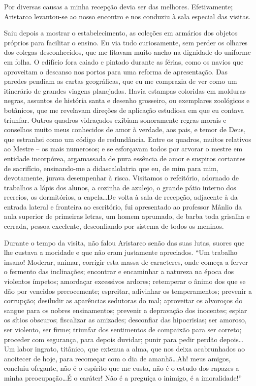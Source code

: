 Por diversas causas a minha recepção devia ser das melhores.
Efetivamente; Aristarco levantou{}-se ao nosso encontro e nos conduziu
à sala especial das visitas. 

Saiu depois a mostrar o estabelecimento,
as coleções em armários dos objetos próprios para facilitar o ensino.
Eu via tudo curiosamente, sem perder os olhares dos colegas
desconhecidos, que me fitavam muito ancho na dignidade do uniforme em
folha. O edifício fora caiado e pintado durante as férias, como os
navios que aproveitam o descanso nos portos para uma reforma de
apresentação. Das paredes pendiam as cartas geográficas, que eu me
comprazia de ver como um itinerário de grandes viagens planejadas.
Havia estampas coloridas em molduras negras, assuntos de história santa
e desenho grosseiro, ou exemplares zoológicos e botânicos, que me
revelavam direções de aplicação estudiosa em que eu contava triunfar.
Outros quadros vidraçados exibiam sonoramente regras morais e conselhos
muito meus conhecidos de amor à verdade, aos pais, e temor de Deus, que
estranhei como um código de redundância. Entre os quadros, muitos relativos ao
Mestre -- os mais numerosos; e se esforçavam todos por arvorar o mestre
em entidade incorpórea, argamassada de pura essência de amor e suspiros
cortantes de sacrifício, ensinando{}-me a didascalolatria que eu, de
mim para mim, devotamente, jurava desempenhar à risca. Visitamos o
refeitório, adornado de trabalhos a lápis dos alunos, a cozinha de
azulejo, o grande pátio interno dos recreios, os dormitórios, a
capela\ldots De volta à sala de recepção, adjacente à da entrada lateral e
fronteira ao escritório, fui apresentado ao professor Mânlio da aula
superior de primeiras letras, um homem aprumado, de barba toda grisalha
e cerrada, pessoa excelente, desconfiando por sistema de todos os
meninos. 

Durante o tempo da visita, não falou Aristarco senão das suas
lutas, suores que lhe custava a mocidade e que não eram justamente
apreciados. ``Um trabalho insano! Moderar, animar, corrigir esta massa
de caracteres, onde começa a ferver o fermento das inclinações;
encontrar e encaminhar a natureza na época dos violentos ímpetos;
amordaçar excessivos ardores; retemperar o ânimo dos que se dão por
vencidos precocemente; espreitar, adivinhar os temperamentos; prevenir
a corrupção; desiludir as aparências sedutoras do mal; aproveitar os
alvoroços do sangue para os nobres ensinamentos; prevenir a depravação
dos inocentes; espiar os sítios obscuros; fiscalizar as amizades;
desconfiar das hipocrisias; ser amoroso, ser violento, ser firme;
triunfar dos sentimentos de compaixão para ser correto; proceder com
segurança, para depois duvidar; punir para pedir perdão depois\ldots Um
labor ingrato, titânico, que extenua a alma, que nos deixa acabrunhados
ao anoitecer de hoje, para recomeçar com o dia de amanhã\ldots Ah! meus
amigos, concluiu ofegante, não é o espírito que me custa, não é o
estudo dos rapazes a minha preocupação\ldots É o caráter! Não é a preguiça
o inimigo, é a imoralidade!'' 

